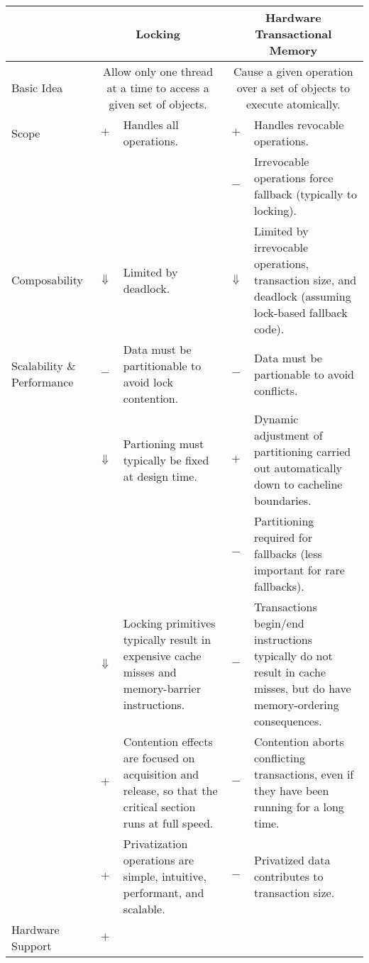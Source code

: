
\begin{table*}[p]
\begin{center}
\begin{tabular}{p{1.0in}||c|p{2.0in}||c|p{2.0in}}
& \multicolumn{2}{c||}{Locking} & \multicolumn{2}{c}{Hardware Transactional Memory} \\
\hline
\hline
Basic Idea
	& \multicolumn{2}{p{2.2in}||}{
	  Allow only one thread at a time to access a given set of objects.}
		& \multicolumn{2}{p{2.2in}}{
		  Cause a given operation over a set of objects to execute
		  atomically.} \\
\hline
\hline
Scope
	& $+$
	& Handles all operations.
		& $+$
		& Handles revocable operations. \\
\cline{4-5}
	& &
		& $-$
		& Irrevocable operations force fallback (typically
		  to locking). \\
\hline
Composability
	& $\Downarrow$
	& Limited by deadlock.
		& $\Downarrow$
		& Limited by irrevocable operations, transaction size,
		  and deadlock (assuming lock-based fallback code). \\
\hline
Scalability \& Performance
	& $-$
	& Data must be partitionable to avoid lock contention.
		& $-$
		& Data must be partionable to avoid conflicts. \\
\cline{2-5}
	& $\Downarrow$
	& Partioning must typically be fixed at design time.
		& $+$
		& Dynamic adjustment of partitioning carried out
		  automatically down to cacheline boundaries. \\
\cline{4-5}
	&
	&
		& $-$
		& Partitioning required for fallbacks (less important
		  for rare fallbacks). \\
\cline{2-5}
	& $\Downarrow$
	& Locking primitives typically result in expensive cache misses
	  and memory-barrier instructions.
		& $-$
		& Transactions begin/end instructions typically do not
		  result in cache misses, but do have memory-ordering
		  consequences. \\
\cline{2-5}
	& $+$
	& Contention effects are focused on acquisition and release, so
	  that the critical section runs at full speed.
		& $-$
		& Contention aborts conflicting transactions, even
		  if they have been running for a long time. \\
\cline{2-5}
	& $+$
	& Privatization operations are simple, intuitive, performant,
	  and scalable.
		& $-$
		& Privatized data contributes to transaction size. \\
\hline
Hardware Support
	& $+$

\end{tabular}
\end{center}
\end{table*}
